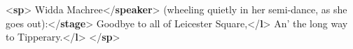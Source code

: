 \begin{shaded}
{<\textbf{sp}>}\mbox{}\newline 
{}Widda Machree{</\textbf{speaker}>}\mbox{}\newline 
{}(wheeling quietly in her semi-dance,\mbox{}\newline 
\hspace*{1em}\hspace*{1em} as she goes out):{</\textbf{stage}>}\mbox{}\newline 
{}\mbox{}\newline 
\hspace*{1em}Goodbye to all of Leicester Square,{</\textbf{l}>}\mbox{}\newline 
\hspace*{1em}An' the long way to Tipperary.{</\textbf{l}>}\mbox{}\newline 
{}\mbox{}\newline 
{</\textbf{sp}>}\end{shaded}\egroup\par \par

